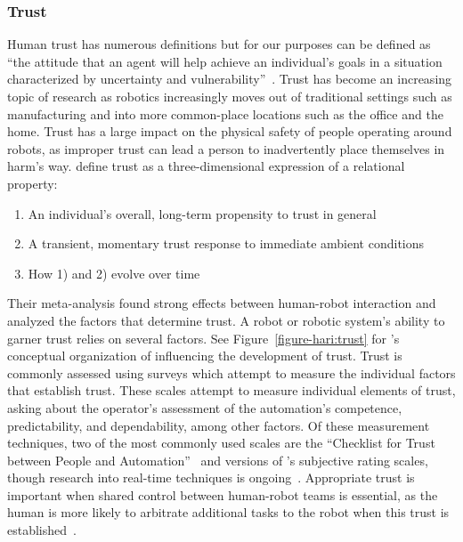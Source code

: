 \subsubsection{Trust}
Human trust has numerous definitions but for our purposes can be defined as ``the attitude that an agent will help achieve an individual's goals in a situation characterized by uncertainty and vulnerability''~\citep{lee_trust_2004}.
Trust has become an increasing topic of research as robotics increasingly moves out of traditional settings such as manufacturing and into more common-place locations such as the office and the home.
Trust has a large impact on the physical safety of people operating around robots, as improper trust can lead a person to inadvertently place themselves in harm's way.
\cite{schaefer_meta-analysis_2016} define trust as a three-dimensional expression of a relational property:
\begin{enumerate}
    \item An individual's overall, long-term propensity to trust in general
    \item A transient, momentary trust response to immediate ambient conditions
    \item How 1) and 2) evolve over time
\end{enumerate}
Their meta-analysis found strong effects between human-robot interaction and analyzed the factors that determine trust.
A robot or robotic system's ability to garner trust relies on several factors.
See Figure~\ref{figure-hari:trust} for \citeauthor{schaefer_meta-analysis_2016}'s conceptual organization of influencing the development of trust.
Trust is commonly assessed using surveys which attempt to measure the individual factors that establish trust.
These scales attempt to measure individual elements of trust, asking about the operator's assessment of the automation's competence, predictability, and dependability, among other factors.
Of these measurement techniques, two of the most commonly used scales are the ``Checklist for Trust between People and Automation''~\citep{jian_foundations_2000} and versions of \citeauthor{muir_trust_1996}'s subjective rating scales, though research into real-time techniques is ongoing~\citep{SEPPELT201966}.
Appropriate trust is important when shared control between human-robot teams is essential, as the human is more likely to arbitrate additional tasks to the robot when this trust is established~\citep{losey_review_2018}.

